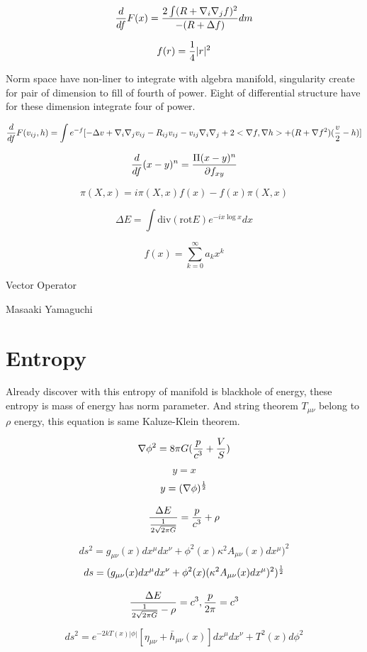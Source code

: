 \documentclass{jsarticle}
\begin{document}
$$ {d \over df}F(x) = {2 \int (R + \nabla_{i} \nabla_{j} f)^2 \over - (R+ \Delta f)}dm $$

$$ f(r) = {1 \over 4}|r|^2 $$

  Norm space have non-liner to integrate with algebra manifold, singularity create for pair of dimension to fill
of fourth of power. Eight of differential structure have for these dimension integrate four of power.

$$ {d \over df}F(v_{ij}, h) = \int e^{-f} [- \Delta v + \nabla_{i} \nabla_{j} v_{ij} - R_{ij}v_{ij} 
- v_{ij} \nabla_{i} \nabla_{j} + 2 <\nabla f, \nabla h > + (R + \nabla f^2)({v \over 2} -h)] $$

$$ {d \over df}(x - y)^n = {\Pi(x - y)^n \over \partial f_{xy}} $$

$$ \pi(X, x) = i\pi(X, x)f(x) - f(x) \pi(X, x) $$

$$ \Delta E = \int \mathrm{div} (\mathrm{rot}E)e^{-ix \log x} dx $$

$$ f(x) = \sum_{k=0}^\infty a_{k}x^k $$
 
\newpage
\begin{center}
\large	Vector Operator
\end{center}
\begin{center}
	Masaaki Yamaguchi
\end{center}



\section{Entropy}
   Already discover with this entropy of manifold is blackhole of energy, these entropy is mass of energy has
norm parameter. And string theorem $ T_{\mu\nu}$  belong to $ \rho $ energy, this equation is same Kaluze-Klein theorem.


 $$ \nabla \phi^2 = 8 \pi G({p \over c^3} + {V \over S})$$

 $$  y = x $$
 $$  y = (\nabla \phi)^{1 \over 2} $$

  $$ {\Delta E \over {1 \over 2\sqrt{2 \pi G}}} = {p \over c^3} + \rho $$

  $$ ds^2 = g_{\mu\nu}(x)dx^{\mu}dx^{\nu} + \phi^2(x)\kappa^2 A_{\mu\nu}(x)dx^{\mu})^2 $$
  $$ ds = (g_{\mu\nu}(x)dx^{\mu}dx^{\nu} + \phi^2(x)(\kappa^2 A_{\mu\nu}(x)dx^{\mu})^2)^{1 \over 2} $$

  $$ {\Delta E \over {1 \over 2\sqrt{2 \pi G}} - \rho} = c^3, {p \over 2 \pi} = c^3 $$
    

  $$ ds^2 = e^{-2kT(x)|\phi|}[\eta_{\mu\nu} + \bar{h}_{\mu\nu}(x)]dx^{\mu}dx^{\nu} + T^2(x) d\phi^2 $$
\end{document}
